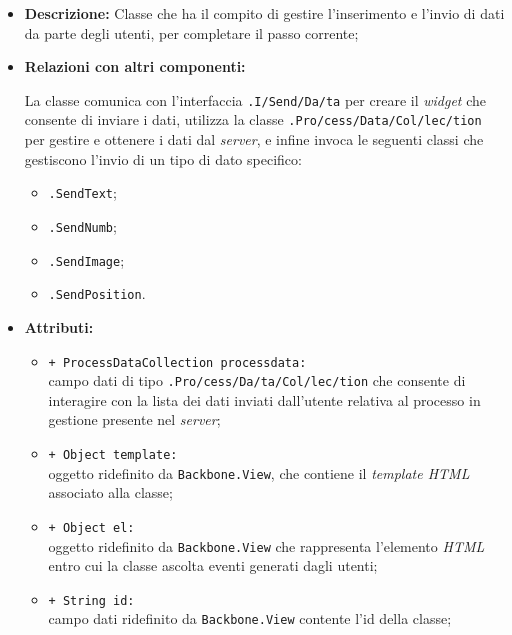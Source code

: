 \begin{flushleft}
\begin{itemize}
\item \textbf{Descrizione:} Classe che ha il compito di gestire l'inserimento e l'invio di dati da parte degli utenti, per completare il passo corrente;
\item \textbf{Relazioni con altri componenti:}
\begin{sloppypar}
La classe comunica con l'interfaccia \texttt{\viewUser{}.I\fshyp{}Send\fshyp{}Da\fshyp{}ta} per creare il \textit{widget} che consente di inviare i dati, utilizza la classe \texttt{\collection{}.Pro\fshyp{}cess\fshyp{}Data\fshyp{}Col\fshyp{}lec\fshyp{}tion} per gestire e ottenere i dati dal \textit{server}, e infine invoca le seguenti classi che gestiscono l'invio di un tipo di dato specifico:
\begin{itemize}
	\item \texttt{\logicUser{}.SendText};
	\item \texttt{\logicUser{}.SendNumb};
	\item \texttt{\logicUser{}.SendImage};
	\item \texttt{\logicUser{}.SendPosition}.
\end{itemize}
\end{sloppypar}
\item \textbf{Attributi:}
\begin{sloppypar}
\begin{itemize}
\item \texttt{+ ProcessDataCollection processdata:}\\ campo dati di tipo \texttt{\collection{}.Pro\fshyp{}cess\fshyp{}Da\fshyp{}ta\fshyp{}Col\fshyp{}lec\fshyp{}tion} che consente di interagire con la lista dei dati inviati dall'utente relativa al processo in gestione presente nel \textit{server};
\item \texttt{+ Object template:}\\ oggetto ridefinito da \texttt{Backbone.View}, che contiene il \textit{template HTML} associato alla classe;
\item \texttt{+ Object el:}\\ oggetto ridefinito da \texttt{Backbone.View} che rappresenta l'elemento \textit{HTML} entro cui la classe ascolta eventi generati dagli utenti;
\item \texttt{+ String id:}\\ campo dati ridefinito da \texttt{Backbone.View} contente l'id della classe;
\end{itemize}

\end{sloppypar}
\end{itemize}
\end{flushleft}
